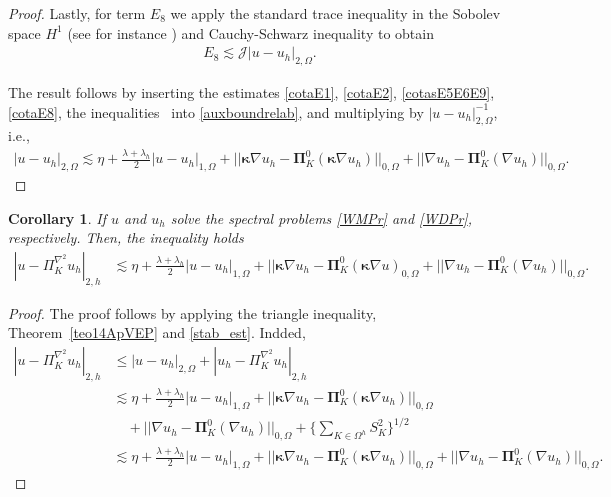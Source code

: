 \documentclass[final,reqno]{elsarticle}
\newtheorem{corollary}{Corollary}[section]
\newcommand\cJ{\mathcal{J}}
\def\bkappa{\boldsymbol{\kappa}}
\def\bPi{\mathbf{\Pi}}
\begin{document}
\begin{proof}
Lastly, for term $E_8$ we apply the standard trace inequality in the Sobolev space $H^1$ (see for instance \cite{G}) and Cauchy-Schwarz inequality to obtain 
\begin{align}
  E_8\lesssim  \cJ |u-u_h|_{2,\Omega}. \label{cotaE8}
\end{align}

The result follows by inserting the estimates \eqref{cotaE1}, \eqref{cotaE2}, \eqref{cotasE5E6E9}, \eqref{cotaE8}, the inequalities~\cite[(39), (40) and (43)]{dassi2025posteriorierrorestimatesc1} into \eqref{auxboundrelab}, and multiplying by $|u-u_h|_{2,\Omega}^{-1}$, i.e.,
\begin{align*}
    |u-u_h|_{2,\Omega}\lesssim \eta +  \frac{\lambda+\lambda_h}{2}|u-u_h|_{1,\Omega} +||\bkappa \nabla u_h-\bPi_K^0(\bkappa \nabla u_h)||_{0,\Omega} +||\nabla u_h -\bPi_K^0(\nabla u_h) ||_{0,\Omega}.  
\end{align*}
\end{proof}


\begin{corollary}\label{cor15ApVEP}
    If  $u$ and $u_h$ solve the spectral problems \eqref{WMPr} and \eqref{WDPr}, respectively. Then, the inequality holds
     \begin{align}
        |u-\Pi_K^{\nabla^2}u_h|_{2,h}&\lesssim \eta + \frac{\lambda + \lambda_h}{2}|u-u_h|_{1,\Omega} +||\bkappa \nabla u_h - \bPi_K^0(\bkappa \nabla u)_{0,\Omega} + ||\nabla u_h - \bPi_K^0(\nabla u_h)||_{0,\Omega}.\nonumber
    \end{align}   
\end{corollary}
\begin{proof}
The proof follows by applying the triangle inequality, Theorem~\ref{teo14ApVEP}  and \eqref{stab_est}. Indded,  
\begin{align}
    |u-\Pi_K^{\nabla^2}u_h|_{2,h}&\leq |u-u_h|_{2,\Omega} + |u_h-\Pi_K^{\nabla^2}u_h|_{2,h}\nonumber\\
    &\lesssim  \eta +  \frac{\lambda+\lambda_h}{2}|u-u_h|_{1,\Omega} +||\bkappa \nabla u_h-\bPi_K^0(\bkappa \nabla u_h)||_{0,\Omega} \nonumber\\
    & \quad +||\nabla u_h -\bPi_K^0(\nabla u_h) ||_{0,\Omega} + \Big\{\sum\limits_{K\in \Omega^h} S_K^2\Big\}^{1/2}\nonumber\\
    &\lesssim  \eta +  \frac{\lambda+\lambda_h}{2}|u-u_h|_{1,\Omega} +||\bkappa \nabla u_h-\bPi_K^0(\bkappa \nabla u_h)||_{0,\Omega} +||\nabla u_h -\bPi_K^0(\nabla u_h) ||_{0,\Omega}.\nonumber 
\end{align}
\end{proof}
\end{document}

